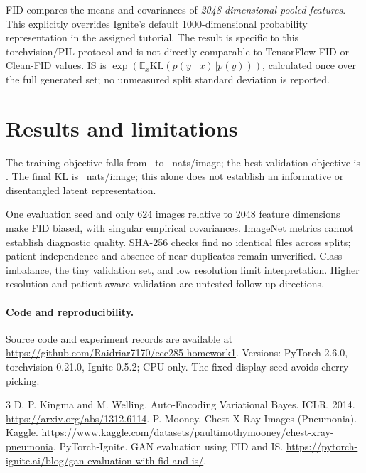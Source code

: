 \documentclass{article}
\begin{document}
FID compares the means and covariances of \emph{2048-dimensional pooled features}. This explicitly overrides Ignite's default 1000-dimensional probability representation in the assigned tutorial. The result is specific to this torchvision/PIL protocol and is not directly comparable to TensorFlow FID or Clean-FID values. IS is $\exp(\mathbb{E}_x\mathrm{KL}(p(y\mid x)\Vert p(y)))$, calculated once over the full generated set; no unmeasured split standard deviation is reported.

\section{Results and limitations}
The training objective falls from \FirstTrain\ to \LastTrain\ nats/image; the best validation objective is \BestVal. The final KL is \LastKL\ nats/image; this alone does not establish an informative or disentangled latent representation. \VisualObservation

One evaluation seed and only 624 images relative to 2048 feature dimensions make FID biased, with singular empirical covariances. ImageNet metrics cannot establish diagnostic quality. SHA-256 checks find no identical files across splits; patient independence and absence of near-duplicates remain unverified. Class imbalance, the tiny validation set, and low resolution limit interpretation. Higher resolution and patient-aware validation are untested follow-up directions.

\paragraph{Code and reproducibility.} Source code and experiment records are available at
\url{https://github.com/Raidriar7170/ece285-homework1}.
Versions: PyTorch 2.6.0, torchvision 0.21.0, Ignite 0.5.2; CPU only. The fixed display seed avoids cherry-picking.

\begin{thebibliography}{3}
\small
{} D. P. Kingma and M. Welling. Auto-Encoding Variational Bayes. ICLR, 2014. \url{https://arxiv.org/abs/1312.6114}.
 P. Mooney. Chest X-Ray Images (Pneumonia). Kaggle. \url{https://www.kaggle.com/datasets/paultimothymooney/chest-xray-pneumonia}.
 PyTorch-Ignite. GAN evaluation using FID and IS. \url{https://pytorch-ignite.ai/blog/gan-evaluation-with-fid-and-is/}.
\end{thebibliography}
\end{document}
